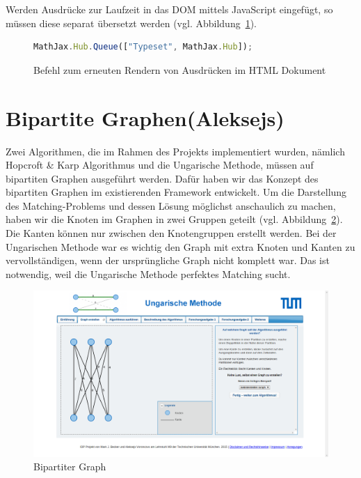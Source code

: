 Werden Ausdrücke zur Laufzeit in das DOM mittels JavaScript eingefügt, so müssen diese separat übersetzt werden (vgl. Abbildung~\ref{fig:listing-mathjax-render}).

\begin{figure}[h!]
\begin{lstlisting}[language=JavaScript]
MathJax.Hub.Queue(["Typeset", MathJax.Hub]);
\end{lstlisting}
\caption[MathJAX Render Befehl]{Befehl zum erneuten Rendern von Ausdrücken im HTML Dokument}\label{fig:listing-mathjax-render}
\end{figure}

\section{Bipartite Graphen(Aleksejs)}
Zwei Algorithmen, die im Rahmen des Projekts implementiert wurden, nämlich Hopcroft \& Karp Algorithmus und die Ungarische Methode, müssen auf bipartiten Graphen ausgeführt werden. Dafür haben wir das Konzept des bipartiten Graphen im existierenden Framework entwickelt. Um die Darstellung des Matching-Problems und dessen Lösung möglichst anschaulich zu machen, haben wir die Knoten im Graphen in zwei Gruppen geteilt (vgl. Abbildung~\ref{fig:hungarian-bipartite}). Die Kanten können nur zwischen den Knotengruppen erstellt werden. Bei der Ungarischen Methode war es wichtig den Graph mit extra Knoten und Kanten zu vervollständigen, wenn der ursprüngliche Graph nicht komplett war. Das ist notwendig, weil die Ungarische Methode perfektes Matching sucht.
\begin{figure}[h!]
	\centering
	\includegraphics[width=\textwidth]{figures/hungarian-bipartite}
	\caption[Ungarische Methode]{Bipartiter Graph}\label{fig:hungarian-bipartite}
\end{figure}

